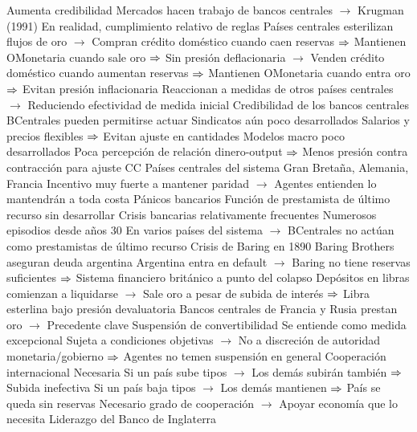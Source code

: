 \documentclass{nuevotema}
\begin{document}
\begin{esquemal}
				\4[] Aumenta credibilidad
				\4[] Mercados hacen trabajo de bancos centrales
				\4[] $\to$ Krugman (1991)
				\4 En realidad, cumplimiento relativo de reglas
				\4[] Países centrales esterilizan flujos de oro
				\4[] $\to$ Compran crédito doméstico cuando caen reservas
				\4[] $\Rightarrow$ Mantienen OMonetaria cuando sale oro
				\4[] $\Rightarrow$ Sin presión deflacionaria
				\4[] $\to$ Venden crédito doméstico cuando aumentan reservas
				\4[] $\Rightarrow$ Mantienen OMonetaria cuando entra oro
				\4[] $\Rightarrow$ Evitan presión inflacionaria
				\4[] Reaccionan a medidas de otros países centrales
				\4[] $\to$ Reduciendo efectividad de medida inicial
			\3 Credibilidad de los bancos centrales
				\4 BCentrales pueden permitirse actuar
				\4 Sindicatos aún poco desarrollados
				\4[] Salarios y precios flexibles
				\4[] $\Rightarrow$ Evitan ajuste en cantidades
				\4 Modelos macro poco desarrollados
				\4[] Poca percepción de relación dinero-output
				\4[] $\Rightarrow$ Menos presión contra contracción para ajuste CC
				\4 Países centrales del sistema
				\4[] Gran Bretaña, Alemania, Francia
				\4[] Incentivo muy fuerte a mantener paridad
				\4[] $\to$ Agentes entienden lo mantendrán a toda costa
			\3 Pánicos bancarios
				\4 Función de prestamista de último recurso sin desarrollar
				\4 Crisis bancarias relativamente frecuentes
				\4[] Numerosos episodios desde años 30
				\4[] En varios países del sistema
				\4[] $\to$ BCentrales no actúan como prestamistas de último recurso
				\4 Crisis de Baring en 1890
				\4[] Baring Brothers aseguran deuda argentina
				\4[] Argentina entra en default
				\4[] $\to$ Baring no tiene reservas suficientes
				\4[] $\Rightarrow$ Sistema financiero británico a punto del colapso
				\4[] Depósitos en libras comienzan a liquidarse
				\4[] $\to$ Sale oro a pesar de subida de interés
				\4[] $\Rightarrow$ Libra esterlina bajo presión devaluatoria
				\4[] Bancos centrales de Francia y Rusia prestan oro
				\4[] $\to$ Precedente clave
				\4 Suspensión de convertibilidad
				\4[] Se entiende como medida excepcional
				\4[] Sujeta a condiciones objetivas
				\4[] $\to$ No a discreción de autoridad monetaria/gobierno
				\4[] $\Rightarrow$ Agentes no temen suspensión en general
			\3 Cooperación internacional
				\4 Necesaria
				\4[] Si un país sube tipos
				\4[] $\to$ Los demás subirán también
				\4[] $\Rightarrow$ Subida inefectiva
				\4[] Si un país baja tipos
				\4[] $\to$ Los demás mantienen
				\4[] $\Rightarrow$ País se queda sin reservas
				\4[] Necesario grado de cooperación
				\4[] $\to$ Apoyar economía que lo necesita
				\4[] Liderazgo del Banco de Inglaterra

\end{esquemal}
\end{document}
